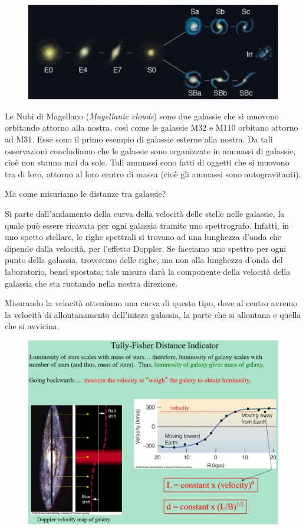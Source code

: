 \begin{figure} [H]
    \centering
    \includegraphics[width=\textwidth]{immagini_lezioni12-12/bho.png}
\end{figure}

Le Nubi di Magellano (\textit{Magellanic clouds}) sono due galassie che si muovono orbitando attorno alla nostra, così come le galassie M32 e M110 orbitano attorno ad M31. Esse sono il primo esempio di galassie esterne alla nostra. Da tali osservazioni concludiamo che le galassie sono organizzate in ammassi di galassie, cioè non stanno mai da sole. Tali ammassi sono fatti di oggetti che si muovono tra di loro, attorno al loro centro di massa (cioè gli ammassi sono autogravitanti).

\vspace{0.2cm}Ma come misuriamo le distanze tra galassie?

Si parte dall'andamento della curva della velocità delle stelle nelle galassie, la quale può essere ricavata per ogni galassia tramite uno spettrografo. Infatti, in uno spetto stellare, le righe spettrali si trovano ad una lunghezza d'onda che dipende dalla velocità, per l'effetto Doppler. Se facciamo uno spettro per ogni punto della galassia, troveremo delle righe, ma non alla lunghezza d'onda del laboratorio, bensì spostata; tale misura darà la componente della velocità della galassia che sta ruotando nella nostra direzione.

Misurando la velocità otteniamo una curva di questo tipo, dove al centro avremo la velocità di allontanamento dell'intera galassia, la parte che si allontana e quella che si avvicina.

\begin{figure}[H]
    \centering
    \includegraphics[width=\textwidth]{immagini_lezioni12-12/tully-fisher.png}
\end{figure}

